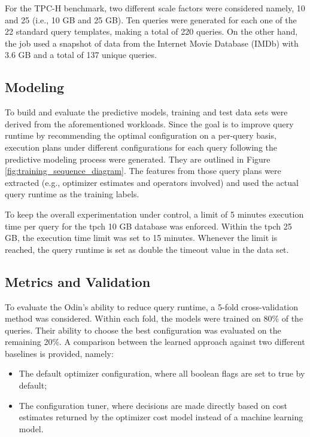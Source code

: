 For the TPC-H benchmark, two different scale factors were considered namely, 10 and 25 (i.e., 10 GB and 25 GB). Ten queries were generated  for each one of the 22 standard query templates, making a total of 220 queries. On the other hand, the \gls{job} used a snapshot of data from the Internet Movie Database (IMDb) with 3.6 GB and a total of 137 unique queries.

\subsection{Modeling}

To build and evaluate the predictive models, training and test data sets were derived from the aforementioned workloads. Since the goal is to improve query runtime by recommending the optimal configuration on a per-query basis, execution plans under different configurations for each query following the predictive modeling process were generated. They are outlined in Figure \ref{fig:training_sequence_diagram}. The features from those query plans were extracted (e.g., optimizer estimates and operators involved) and used the actual query runtime as the training labels.

To keep the overall experimentation under control,  a limit of 5 minutes execution time per query for the \gls{tpch} 10 GB database was enforced. Within the \gls{tpch} 25 GB, the execution time limit was set to 15 minutes. Whenever the limit is reached, the query runtime is set as double the timeout value in the data set.

\subsection{Metrics and Validation}

To evaluate the Odin's ability to reduce query runtime, a 5-fold cross-validation method was considered. Within each fold, the models were trained on 80\% of the queries. Their ability to choose the best configuration was evaluated on the remaining 20\%. A comparison between the  learned approach against two different baselines is provided, namely:

\begin{itemize}
    \item The default optimizer configuration, where all boolean flags are set to true by default;
    \item The configuration tuner, where decisions are made directly based on cost estimates returned by the optimizer cost model instead of a machine learning model.
\end{itemize}